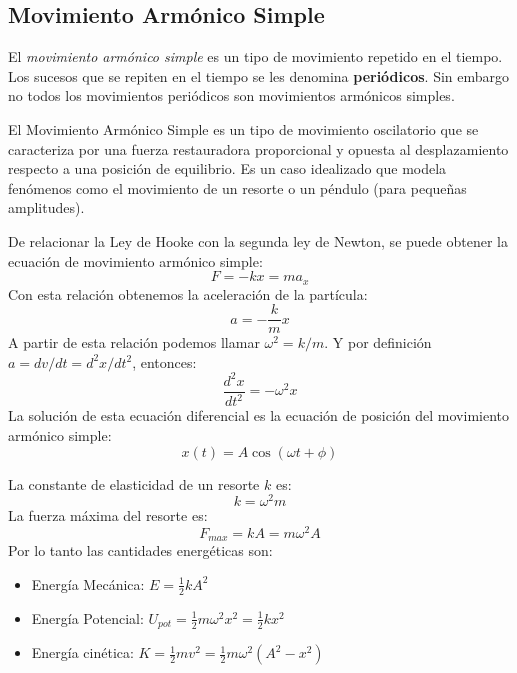 \subsection{Movimiento Armónico Simple}
\label{sec:mas}

El \textit{movimiento armónico simple} es un tipo de movimiento repetido en el tiempo. Los sucesos que se repiten en el tiempo se les denomina \textbf{periódicos}. Sin embargo no todos los movimientos periódicos son movimientos armónicos simples.

El Movimiento Armónico Simple es un tipo de movimiento oscilatorio que se caracteriza por una fuerza restauradora proporcional y opuesta al desplazamiento respecto a una posición de equilibrio. Es un caso idealizado que modela fenómenos como el movimiento de un resorte o un péndulo (para pequeñas amplitudes).

\begin{tcolorbox}[remember, title=M.A.S. a partir de la Ley de Hooke]
  De relacionar la Ley de Hooke con la segunda ley de Newton, se puede obtener la ecuación de movimiento armónico simple:
  \[
    F = -kx = m a_x
  \]
  Con esta relación obtenemos la aceleración de la partícula:
  \[
    a = -\frac{k}{m} x 
  \]
  A partir de esta relación podemos llamar \(\omega^2 = k/m\). Y por definición \(a = dv/dt = d^2x/dt^2\), entonces:
  \[
    \boxed{\frac{d^2x}{dt^2} = -\omega^2 x}
  \]
  La solución de esta ecuación diferencial es la ecuación de posición del movimiento armónico simple:
  \[
    x(t) = A\cos(\omega t + \phi)
  \]
\end{tcolorbox}

\begin{tcolorbox}[remember, title=Cantidades a partir de la definición]
  La constante de elasticidad de un resorte \(k\) es:
  \[
    k = \omega^2 m
  \]
  La fuerza máxima del resorte es:
  \[
    F_{max} = kA = m \omega^2 A
  \]
  Por lo tanto las cantidades energéticas son:
  \begin{itemize}
    \item Energía Mecánica: \( E = \frac{1}{2} kA^2 \)
    \item Energía Potencial: \( U_{pot} = \frac{1}{2} m \omega^2 x^2 = \frac{1}{2} kx^2 \)
    \item Energía cinética: \( K = \frac{1}{2} m v^2 = \frac{1}{2} m \omega^2 (A^2 - x^2) \)
  \end{itemize}
\end{tcolorbox}

